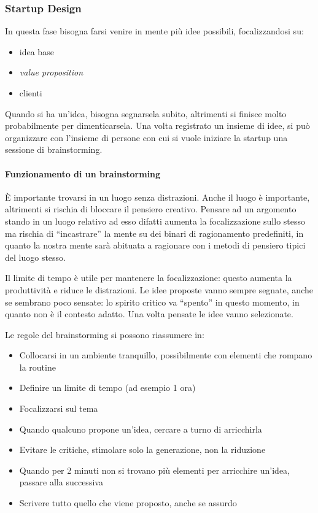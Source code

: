 \subsubsection{Startup Design}

In questa fase bisogna farsi venire in mente più idee possibili, focalizzandosi
su:
\begin{itemize}
 \item idea base
 \item \textit{value proposition}
 \item clienti
\end{itemize}

Quando si ha un'idea, bisogna segnarsela subito, altrimenti si finisce molto
probabilmente per dimenticarsela. Una volta registrato un insieme di idee, si
può organizzare con l'insieme di persone con cui si vuole iniziare la startup
una sessione di brainstorming.

\paragraph*{Funzionamento di un brainstorming} È importante trovarsi in un
luogo senza distrazioni. Anche il luogo è importante, altrimenti si rischia di
bloccare il pensiero creativo. Pensare ad un argomento stando in un luogo
relativo ad esso difatti aumenta la focalizzazione sullo stesso ma rischia di
``incastrare'' la mente su dei binari di ragionamento predefiniti, in quanto la
nostra mente sarà abituata a ragionare con i metodi di pensiero tipici del
luogo stesso.

Il limite di tempo è utile per mantenere la focalizzazione: questo aumenta la
produttività e riduce le distrazioni. Le idee proposte vanno sempre segnate,
anche se sembrano poco sensate: lo spirito critico va ``spento'' in questo
momento, in quanto non è il contesto adatto.
Una volta pensate le idee vanno selezionate.

Le regole del brainstorming si possono riassumere in:

\begin{itemize}
 \item Collocarsi in un ambiente tranquillo, possibilmente con elementi che
rompano la routine
 \item Definire un limite di tempo (ad esempio 1 ora)
 \item Focalizzarsi sul tema
 \item Quando qualcuno propone un'idea, cercare a turno di arricchirla
 \item Evitare le critiche, stimolare solo la generazione, non la riduzione
 \item Quando per 2 minuti non si trovano più elementi per arricchire un'idea,
passare alla successiva
 \item Scrivere tutto quello che viene proposto, anche se assurdo 
\end{itemize}


